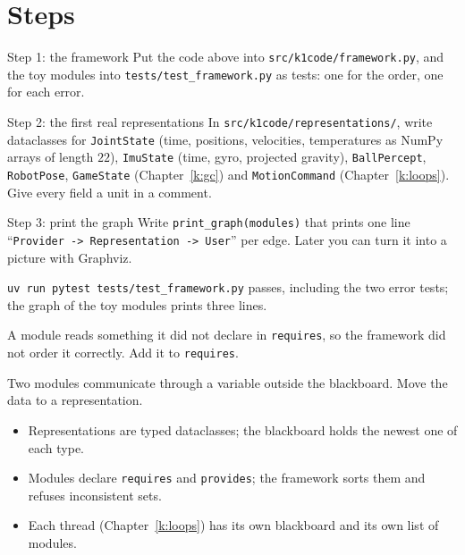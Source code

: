 \section*{Steps}
\begin{stepbox}{Step 1: the framework}
Put the code above into \texttt{src/k1code/framework.py}, and the toy modules into \texttt{tests/test\_framework.py} as tests: one for the order, one for each error.
\end{stepbox}
\begin{stepbox}{Step 2: the first real representations}
In \texttt{src/k1code/representations/}, write dataclasses for \texttt{JointState} (time, positions, velocities, temperatures as NumPy arrays of length $22$), \texttt{ImuState} (time, gyro, projected gravity), \texttt{BallPercept}, \texttt{RobotPose}, \texttt{GameState} (Chapter~\ref{k:gc}) and \texttt{MotionCommand} (Chapter~\ref{k:loops}). Give every field a unit in a comment.
\end{stepbox}
\begin{stepbox}{Step 3: print the graph}
Write \verb!print_graph(modules)! that prints one line ``\texttt{Provider -> Representation -> User}'' per edge. Later you can turn it into a picture with Graphviz.
\end{stepbox}

\begin{checkbox}
\verb!uv run pytest tests/test_framework.py! passes, including the two error tests; the graph of the toy modules prints three lines.
\end{checkbox}

\begin{troublebox}
\begin{description}[leftmargin=0.6cm,nosep]
  \item[\texttt{KeyError: ... is not on the blackboard}] A module reads something it did not declare in \texttt{requires}, so the framework did not order it correctly. Add it to \texttt{requires}.
  \item[A module sees an old value] Two modules communicate through a variable outside the blackboard. Move the data to a representation.
\end{description}
\end{troublebox}

\begin{keyidea}
\begin{itemize}[nosep]
  \item Representations are typed dataclasses; the blackboard holds the newest one of each type.
  \item Modules declare \texttt{requires} and \texttt{provides}; the framework sorts them and refuses inconsistent sets.
  \item Each thread (Chapter~\ref{k:loops}) has its own blackboard and its own list of modules.
\end{itemize}
\end{keyidea}
